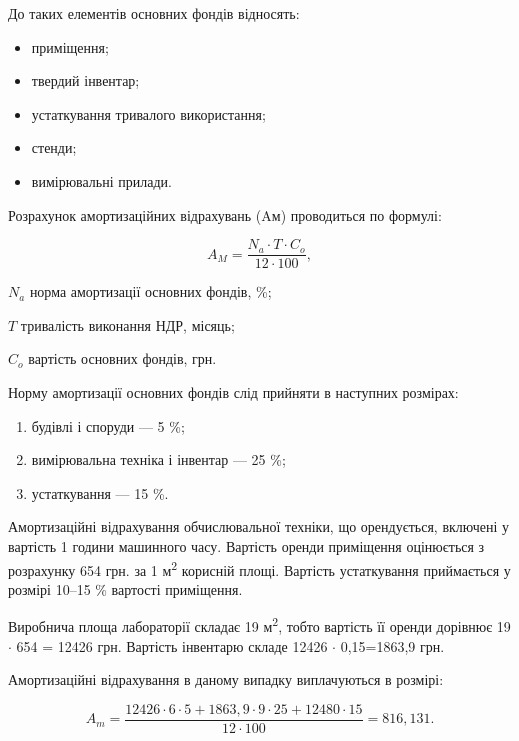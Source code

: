 До таких елементів основних фондів відносять:
\begin{itemize}
\item приміщення;
\item твердий інвентар;
\item устаткування тривалого використання;
\item стенди;
\item вимірювальні прилади.
\end{itemize}

Розрахунок амортизаційних відрахувань (Aм) проводиться по формулі:

\begin{equation}
A_M = \frac{N_a   \cdot   T   \cdot   C_o}{12  \cdot  100}, \nonumber
\end{equation}
\begin{formulaDescription}
\item [$N_a$] норма амортизації основних фондів, \%;
\item [$T$] тривалість виконання НДР, місяць;
\item [$C_o$] вартість основних фондів, грн.
\end{formulaDescription}

Норму амортизації основних фондів слід прийняти в наступних розмірах:

\begin{enumerate}
\item будівлі і споруди --- 5 \%;
\item вимірювальна техніка і інвентар --- 25 \%;
\item устаткування --- 15 \%.
\end{enumerate}

Амортизаційні відрахування обчислювальної техніки, що орендується, включені у вартість 1 години машинного часу. Вартість оренди приміщення оцінюється з розрахунку 654 грн. за 1 м\textsuperscript{2} корисній площі. Вартість устаткування приймається у розмірі 10--15 \% вартості приміщення. 

Виробнича площа лабораторії складає 19 м\textsuperscript{2}, тобто вартість її оренди дорівнює 19 $\cdot$  654 = 12426 грн. Вартість інвентарю складе 12426 $\cdot$  0,15=1863,9 грн.

Амортизаційні відрахування в даному випадку виплачуються в розмірі:

\begin{equation}
A_m = \frac{12426  \cdot  6  \cdot  5+1863,9  \cdot  9  \cdot  25+12480  \cdot  15}{12  \cdot  100} = 816,131. \nonumber
\end{equation}

